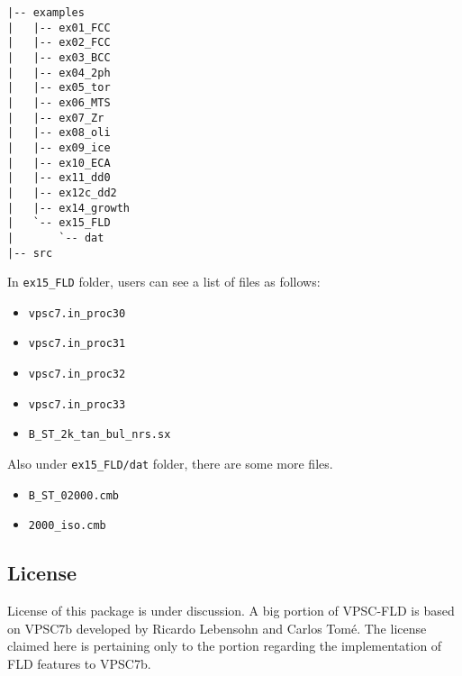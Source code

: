 \documentclass[12pt]{amsart}
\begin{document}
\begin{lstlisting}[style=txt, caption=Result of command tree,label={code:directory}]
|-- examples
|   |-- ex01_FCC
|   |-- ex02_FCC
|   |-- ex03_BCC
|   |-- ex04_2ph
|   |-- ex05_tor
|   |-- ex06_MTS
|   |-- ex07_Zr
|   |-- ex08_oli
|   |-- ex09_ice
|   |-- ex10_ECA
|   |-- ex11_dd0
|   |-- ex12c_dd2
|   |-- ex14_growth
|   `-- ex15_FLD
|       `-- dat
|-- src
\end{lstlisting}
In \verb$ex15_FLD$ folder, users can see a list of files as follows:
\begin{itemize}
\item \verb$vpsc7.in_proc30$
\item \verb$vpsc7.in_proc31$
\item \verb$vpsc7.in_proc32$
\item \verb$vpsc7.in_proc33$
\item \verb$B_ST_2k_tan_bul_nrs.sx$
\end{itemize}
Also under \verb$ex15_FLD/dat$ folder, there are some more files.
\begin{itemize}
\item \verb$B_ST_02000.cmb$
\item \verb$2000_iso.cmb$
\end{itemize}


\subsection{License}
License of this package is under discussion.
A big portion of VPSC-FLD is based on VPSC7b developed by Ricardo Lebensohn and Carlos Tom\'{e}.
The license claimed here is pertaining only to the portion regarding the implementation of FLD features to VPSC7b.
\newpage
\end{document}
